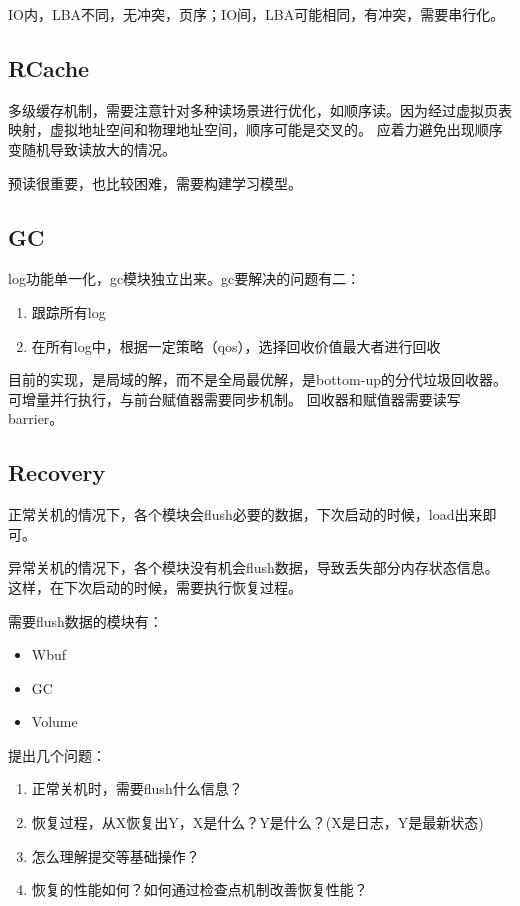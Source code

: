 \documentclass[UTF8]{ctexart}
\begin{document}
IO内，LBA不同，无冲突，页序；IO间，LBA可能相同，有冲突，需要串行化。

\subsection{RCache}

多级缓存机制，需要注意针对多种读场景进行优化，如顺序读。因为经过虚拟页表映射，虚拟地址空间和物理地址空间，顺序可能是交叉的。
应着力避免出现顺序变随机导致读放大的情况。

预读很重要，也比较困难，需要构建学习模型。

\subsection{GC}

log功能单一化，gc模块独立出来。gc要解决的问题有二：
\begin{enumerate}
    \item 跟踪所有log
    \item 在所有log中，根据一定策略（qos），选择回收价值最大者进行回收
\end{enumerate}

目前的实现，是局域的解，而不是全局最优解，是bottom-up的分代垃圾回收器。可增量并行执行，与前台赋值器需要同步机制。
回收器和赋值器需要读写barrier。

\subsection{Recovery}

正常关机的情况下，各个模块会flush必要的数据，下次启动的时候，load出来即可。

异常关机的情况下，各个模块没有机会flush数据，导致丢失部分内存状态信息。
这样，在下次启动的时候，需要执行恢复过程。

需要flush数据的模块有：
\begin{itemize}
    \item Wbuf
    \item GC
    \item Volume
\end{itemize}

\begin{tcolorbox}
提出几个问题：
\begin{enumerate}
    \item 正常关机时，需要flush什么信息？
    \item 恢复过程，从X恢复出Y，X是什么？Y是什么？(X是日志，Y是最新状态)
    \item 怎么理解提交等基础操作？
    \item 恢复的性能如何？如何通过检查点机制改善恢复性能？
\end{enumerate}
\end{tcolorbox}
\end{document}
